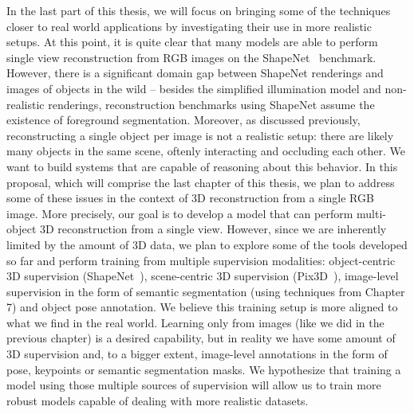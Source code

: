 In the last part of this thesis, we will focus on bringing some of the techniques closer
to real world applications by investigating their use in more realistic setups.
At this point, it is quite clear that many models are able to perform single view reconstruction
from RGB images on the ShapeNet~\cite{shapenet} benchmark.
However, there is a significant domain gap between ShapeNet renderings and images of objects
in the wild -- besides the simplified illumination model and non-realistic renderings, reconstruction
benchmarks using ShapeNet assume the existence of foreground segmentation.
Moreover, as discussed previously, reconstructing a single object per image is not a realistic setup:
there are likely many objects in the same scene, oftenly interacting and occluding each other.
We want to build systems that are capable of reasoning about this behavior.
In this proposal, which will comprise the last chapter of this thesis, we
plan to address some of these issues in the context of 3D reconstruction from a
single RGB image.
More precisely, our goal is to develop a model that can perform multi-object 3D reconstruction from a single view.
However, since we are inherently limited by the amount of 3D data, we plan to explore some of the tools developed so far and perform training from multiple supervision modalities: object-centric 3D supervision (\eg ShapeNet~\cite{shapenet}), scene-centric 3D supervision (\eg Pix3D~\cite{pix3d}), image-level supervision in the form of semantic segmentation (using techniques from Chapter 7) and object pose annotation.
We believe this training setup is more aligned to what we find in the real world.
Learning only from images (like we did in the previous chapter) is a desired capability,
but in reality we have some amount of 3D supervision and, to a bigger extent, image-level annotations
in the form of pose, keypoints or semantic segmentation masks.
We hypothesize that training a model using those multiple sources of supervision will allow us
to train more robust models capable of dealing with more realistic datasets.

